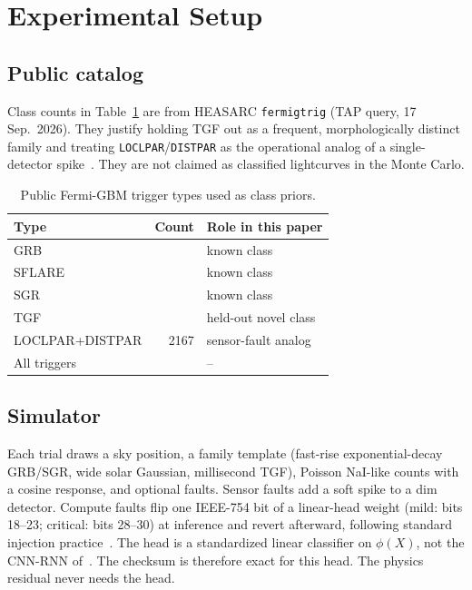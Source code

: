 \documentclass[journal]{IEEEtran}
\begin{document}
\section{Experimental Setup}

\subsection{Public catalog}
Class counts in Table~\ref{tab:cat} are from HEASARC \texttt{fermigtrig} (TAP query, 17 Sep.\ 2026). They justify holding TGF out as a frequent, morphologically distinct family and treating \texttt{LOCLPAR}/\texttt{DISTPAR} as the operational analog of a single-detector spike~\cite{goldstein2019,vonkienlin2020}. They are not claimed as classified lightcurves in the Monte Carlo.

\begin{table}[!t]
\caption{Public Fermi-GBM trigger types used as class priors.}
\label{tab:cat}
\centering
\begin{tabular}{lrl}
\toprule
Type & Count & Role in this paper \\
\midrule
GRB & \CatalogGRB{} & known class \\
SFLARE & \CatalogSflare{} & known class \\
SGR & \CatalogSGR{} & known class \\
TGF & \CatalogTGF{} & held-out novel class \\
LOCLPAR+DISTPAR & 2167 & sensor-fault analog \\
All triggers & \CatalogTotal{} & -- \\
\bottomrule
\end{tabular}
\end{table}

\subsection{Simulator}
Each trial draws a sky position, a family template (fast-rise exponential-decay GRB/SGR, wide solar Gaussian, millisecond TGF), Poisson NaI-like counts with a cosine response, and optional faults. Sensor faults add a soft spike to a dim detector. Compute faults flip one IEEE-754 bit of a linear-head weight (mild: bits 18--23; critical: bits 28--30) at inference and revert afterward, following standard injection practice~\cite{pytorchfi2020,reagen2016}. The head is a standardized linear classifier on $\phi(X)$, not the CNN-RNN of~\cite{john2025}. The checksum is therefore exact for this head. The physics residual never needs the head.
\end{document}
